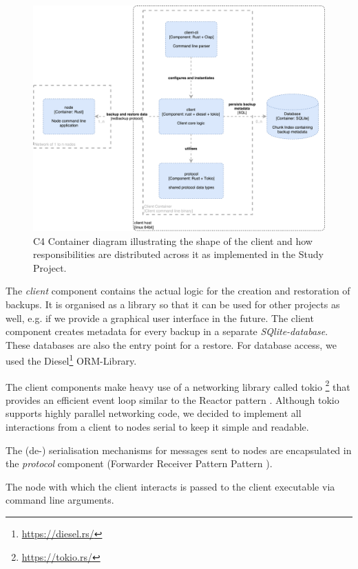 \begin{figure}[h]
	\centering
	\includegraphics[width=1\linewidth]{resources/c4-client-container}
	\caption[Client specific C4 Container diagram]{C4 Container diagram illustrating the shape of the client and how responsibilities are distributed across it as implemented in the Study Project.}
	\label{fig:c4-client-container}
\end{figure}

The \emph{client} component contains the actual logic for the creation and restoration of backups. It is organised as a library so that it can be used for other projects as well, e.g. if we provide a graphical user interface in the future. The client component creates metadata for every backup in a separate \emph{SQlite-database}. These databases are also the entry point for a restore. For database access, we used the Diesel\footnote{\url{https://diesel.rs/}} ORM-Library.

The \gls{client} components make heavy use of a networking library called tokio \footnote{\url{https://tokio.rs/}} that provides an efficient event loop similar to the Reactor pattern \cite{POSA1}. Although tokio supports highly parallel networking code, we decided to implement all interactions from a \gls{client} to \glspl{node} serial to keep it simple and readable.

The (de-) serialisation mechanisms for messages sent to \glspl{node} are encapsulated in the \emph{protocol} component (Forwarder Receiver Pattern Pattern \cite{POSA1}).

The \gls{node} with which the \gls{client} interacts is passed to the client executable via command line arguments.


